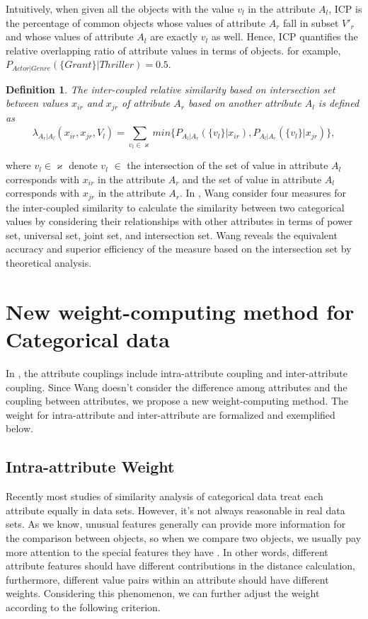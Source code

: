 \documentclass[review]{elsarticle}
\newtheorem{definition}{Definition}
\begin{document}
Intuitively, when given all the objects with the value $v_l$ in the attribute $A_l$, ICP is the percentage of common objects whose values of attribute $A_r$ fall in subset $V'_r$ and whose values of attribute $A_l$ are exactly $v_l$ as well. Hence, ICP quantifies the relative overlapping ratio of attribute values in terms of objects. for example, $P_{Actor|Genre}(\{Grant\} | Thriller) = 0.5$.

\begin{definition} \cite{Wang2015Coupled} The inter-coupled relative similarity based on intersection set between values $x_{ir}$ and $x_{jr}$ of attribute $A_r$ based on another attribute $A_l$ is defined as
\begin{equation}
\lambda_{A_r|A_l}(x_{ir},x_{jr},V_l) = \sum_{v_l \in \varkappa}^{}min\{P_{A_l|A_r}(\{v_l\}|x_{ir}),P_{A_l|A_r}(\{v_l\}|x_{jr})\},
\label{equ4}
\end{equation}
\end{definition}
where $v_l \in \varkappa$ denote $v_l$ $\in$ the intersection of the set of value in attribute $A_l$ corresponds with $x_{ir}$ in the attribute $A_r$ and the set of value in attribute $A_l$ corresponds with $x_{jr}$ in the attribute $A_r$. In \cite{Wang2015Coupled}, Wang consider four measures for the inter-coupled similarity to calculate the similarity between two categorical values by considering their relationships with other attributes in terms of power set, universal set, joint set, and intersection set. Wang reveals the equivalent accuracy and superior efficiency of the measure based on the intersection set by theoretical analysis.

\section{New weight-computing method for Categorical data}

In \cite{Wang2015Coupled}, the attribute couplings include intra-attribute coupling and inter-attribute coupling. Since Wang doesn't consider the difference among attributes and the coupling between attributes, we propose a new weight-computing method. The weight for intra-attribute and inter-attribute are formalized and exemplified below.

\subsection{Intra-attribute Weight}
Recently most studies of similarity analysis of categorical data treat each attribute equally in data sets. However, it's not always reasonable in real data sets. As we know, unusual features generally can provide more information for the comparison between objects, so when we compare two objects, we usually pay more attention to the special features they have \cite{Jia2014A}. In other words, different attribute features should have different contributions in the distance calculation, furthermore, different value pairs within an attribute should have different weights. Considering this phenomenon, we can further adjust the weight according to the following criterion.
\end{document}
